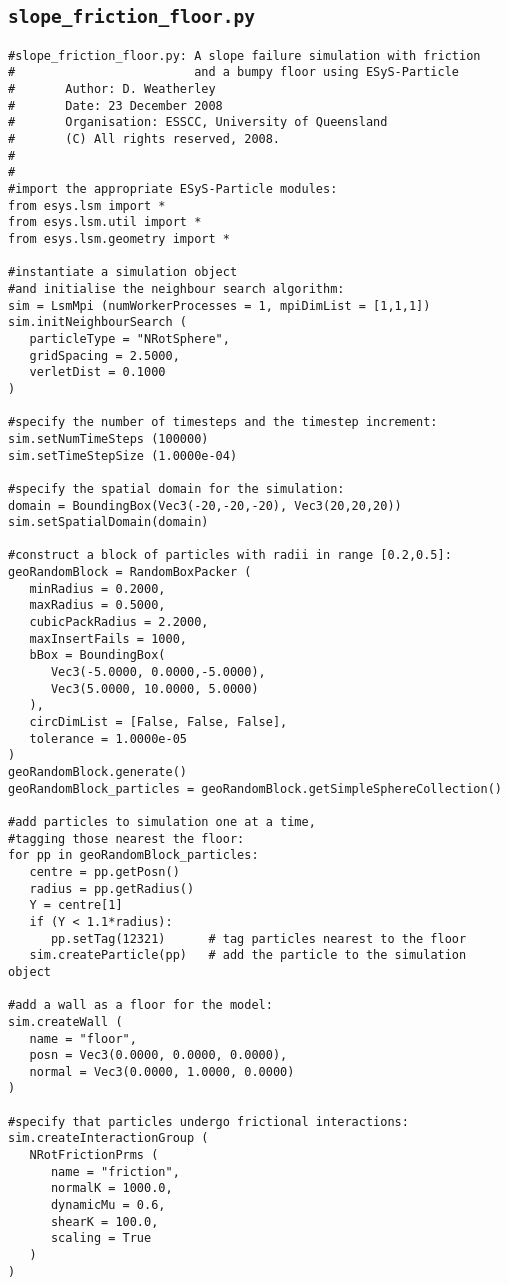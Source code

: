 \subsection{\texttt{slope\_friction\_floor.py}}\label{code:slope_friction_floor}
\begin{verbatim}
#slope_friction_floor.py: A slope failure simulation with friction 
#                         and a bumpy floor using ESyS-Particle
#       Author: D. Weatherley
#       Date: 23 December 2008
#       Organisation: ESSCC, University of Queensland
#       (C) All rights reserved, 2008.
#
#
#import the appropriate ESyS-Particle modules:
from esys.lsm import *
from esys.lsm.util import *
from esys.lsm.geometry import *

#instantiate a simulation object 
#and initialise the neighbour search algorithm:
sim = LsmMpi (numWorkerProcesses = 1, mpiDimList = [1,1,1])
sim.initNeighbourSearch (
   particleType = "NRotSphere",
   gridSpacing = 2.5000,
   verletDist = 0.1000
)

#specify the number of timesteps and the timestep increment:
sim.setNumTimeSteps (100000)
sim.setTimeStepSize (1.0000e-04)

#specify the spatial domain for the simulation:
domain = BoundingBox(Vec3(-20,-20,-20), Vec3(20,20,20))
sim.setSpatialDomain(domain)

#construct a block of particles with radii in range [0.2,0.5]:
geoRandomBlock = RandomBoxPacker (
   minRadius = 0.2000,
   maxRadius = 0.5000,
   cubicPackRadius = 2.2000,
   maxInsertFails = 1000,
   bBox = BoundingBox(
      Vec3(-5.0000, 0.0000,-5.0000),
      Vec3(5.0000, 10.0000, 5.0000)
   ),
   circDimList = [False, False, False],
   tolerance = 1.0000e-05
)
geoRandomBlock.generate()
geoRandomBlock_particles = geoRandomBlock.getSimpleSphereCollection()

#add particles to simulation one at a time, 
#tagging those nearest the floor:
for pp in geoRandomBlock_particles:
   centre = pp.getPosn()
   radius = pp.getRadius()
   Y = centre[1]
   if (Y < 1.1*radius):
      pp.setTag(12321)		# tag particles nearest to the floor
   sim.createParticle(pp)	# add the particle to the simulation object

#add a wall as a floor for the model:
sim.createWall (
   name = "floor",
   posn = Vec3(0.0000, 0.0000, 0.0000),
   normal = Vec3(0.0000, 1.0000, 0.0000)
)

#specify that particles undergo frictional interactions:
sim.createInteractionGroup (
   NRotFrictionPrms (
      name = "friction",
      normalK = 1000.0,
      dynamicMu = 0.6,
      shearK = 100.0,
      scaling = True
   )
)


\end{verbatim}
